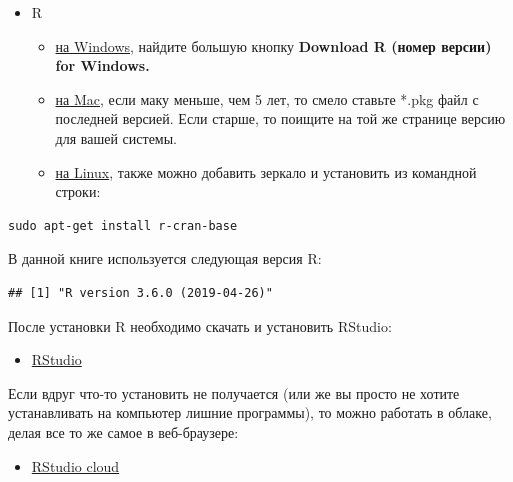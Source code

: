 \documentclass[]{book}
\newenvironment{Shaded}{\begin{snugshade}}{\end{snugshade}}
\newcommand{\KeywordTok}[1]{\textcolor[rgb]{0.13,0.29,0.53}{\textbf{#1}}}
\newcommand{\OperatorTok}[1]{\textcolor[rgb]{0.81,0.36,0.00}{\textbf{#1}}}
\newcommand{\NormalTok}[1]{#1}
\providecommand{\tightlist}{%
  \setlength{\itemsep}{0pt}\setlength{\parskip}{0pt}}
\begin{document}
\begin{itemize}
\tightlist
\item
  R

  \begin{itemize}
  \tightlist
  \item
    \href{https://cran.r-project.org/bin/windows/base/}{на Windows},
    найдите большую кнопку \textbf{Download R (номер версии) for
    Windows.}
  \item
    \href{https://cran.r-project.org/bin/macosx/}{на Mac}, если маку
    меньше, чем 5 лет, то смело ставьте *.pkg файл с последней версией.
    Если старше, то поищите на той же странице версию для вашей системы.
  \item
    \href{https://cran.rstudio.com/bin/linux/}{на Linux}, также можно
    добавить зеркало и установить из командной строки:
  \end{itemize}
\end{itemize}

\begin{verbatim}
sudo apt-get install r-cran-base
\end{verbatim}

В данной книге используется следующая версия R:

\begin{Shaded}
\end{Shaded}

\begin{verbatim}
## [1] "R version 3.6.0 (2019-04-26)"
\end{verbatim}

После установки R необходимо скачать и установить RStudio:

\begin{itemize}
\tightlist
\item
  \href{https://www.rstudio.com/products/rstudio/download/}{RStudio}
\end{itemize}

Если вдруг что-то установить не получается (или же вы просто не хотите
устанавливать на компьютер лишние программы), то можно работать в
облаке, делая все то же самое в веб-браузере:

\begin{itemize}
\tightlist
\item
  \href{https://rstudio.cloud/}{RStudio cloud}
\end{itemize}
\end{document}
